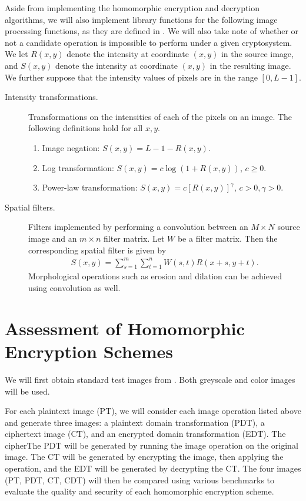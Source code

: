 Aside from implementing the homomorphic encryption and decryption algorithms, we will also implement library functions for the following image processing functions, as they are defined in \cite{gonzalez_digital_2008}. We will also take note of whether or not a candidate operation is impossible to perform under a given cryptosystem.  We let $R(x,y)$ denote the intensity at coordinate $(x,y)$ in the source image, and $S(x,y)$ denote the intensity at coordinate $(x,y)$ in the resulting image. We further suppose that the intensity values of pixels are in the range $[0, L-1]$.
\begin{description}
	\item[Intensity transformations.] Transformations on the intensities of each of the pixels on an image. The following definitions hold for all $x,y$.
	\begin{enumerate}
		\item Image negation: $S(x,y) = L - 1 - R(x,y)$.
		\item Log transformation: $S(x,y) = c\log{(1 + R(x,y))}$, $c \geq 0$.
		\item Power-law transformation: $S(x,y) = c[R(x,y)]^\gamma$, $c > 0, \gamma > 0$.
	\end{enumerate}
	\item[Spatial filters.] Filters implemented by performing a convolution between an $M\times N$ source image and an $m\times n$ filter matrix. Let $W$ be a filter matrix. Then the corresponding spatial filter is given by
	\begin{align}
		S(x,y) = \sum_{s=1}^m{\sum_{t=1}^n{W(s,t)R(x+s,y+t)}}.
	\end{align}
	Morphological operations such as erosion and dilation can be achieved using convolution as well.
\end{description}

\section{Assessment of Homomorphic Encryption Schemes}

We will first obtain standard test images from \cite{gonzalez_image_nodate}. Both greyscale and color images will be used.

For each plaintext image (PT), we will consider each image operation listed above and generate three images: a plaintext domain transformation (PDT), a ciphertext image (CT), and an encrypted domain transformation (EDT). The cipherThe PDT will be generated by running the image operation on the original image. The CT will be generated by encrypting the image, then applying the operation, and the EDT will be generated by decrypting the CT. The four images (PT, PDT, CT, CDT) will then be compared using various benchmarks to evaluate the quality and security of each homomorphic encryption scheme.


